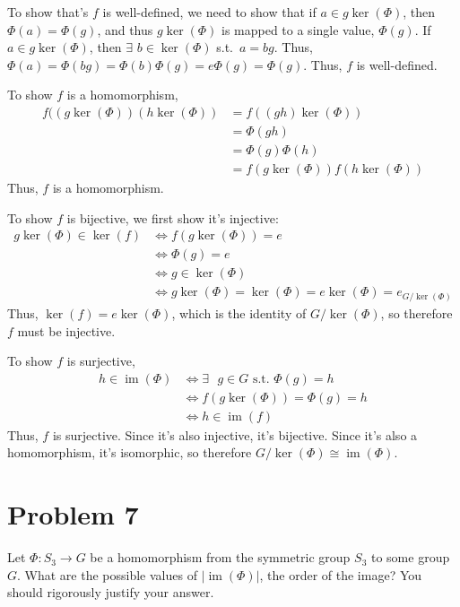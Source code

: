 \documentclass[fleqn]{article}
\DeclareMathOperator{\im}{im}
\begin{document}
        To show that's $f$ is well-defined, we need to show that if $a \in g \ker(\Phi)$, then $\Phi(a) = \Phi(g)$, and thus $g \ker(\Phi)$ is mapped to a single value, $\Phi(g)$.  If $a \in g \ker(\Phi)$, then $\exists$ $b \in \ker(\Phi)$ s.t.\ $a = bg$.  Thus, $\Phi(a) = \Phi(bg) = \Phi(b)\Phi(g) = e\Phi(g) = \Phi(g)$.  Thus, $f$ is well-defined.
        
        To show $f$ is a homomorphism,
        \begin{align}
            f((g \ker(\Phi))(h \ker(\Phi))
                &= f((gh) \ker(\Phi)) \\
                &= \Phi(gh) \\
                &= \Phi(g) \Phi(h) \\
                &= f(g \ker(\Phi)) f(h \ker(\Phi))
        \end{align}
        Thus, $f$ is a homomorphism.
        
        To show $f$ is bijective, we first show it's injective:
        \begin{align}
            g \ker(\Phi) \in \ker(f)
                &\iff f(g \ker(\Phi)) = e \\
                &\iff \Phi(g) = e \\
                &\iff g \in \ker(\Phi) \\
                &\iff g \ker(\Phi) = \ker(\Phi) = e \ker(\Phi) = e_{G/\ker(\Phi)}
        \end{align}
        Thus, $\ker(f) = e\ker(\Phi)$, which is the identity of $G/\ker(\Phi)$, so therefore $f$ must be injective.  
        
        To show $f$ is surjective, 
        \begin{align}
            h \in \im(\Phi)
                &\iff \exists \text{ } g \in G \text{ s.t.\ } \Phi(g) = h \\
                &\iff f(g \ker(\Phi)) = \Phi(g) = h \\
                &\iff h \in \im(f)
        \end{align}
        Thus, $f$ is surjective.  Since it's also injective, it's bijective.  Since it's also a homomorphism, it's isomorphic, so therefore $G/\ker(\Phi) \cong \im(\Phi)$.
    
    \pagebreak
    
    \section{Problem 7}
    Let $\Phi: S_3 \to G$ be a homomorphism from the symmetric group $S_3$ to some group $G$.  What are the possible values of $|\im(\Phi)|$, the order of the image?  You should rigorously justify your answer.
        
\end{document}
